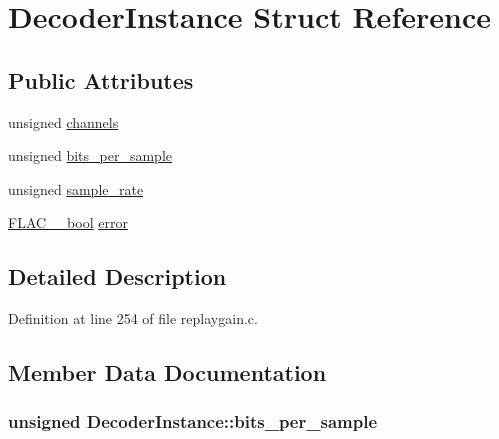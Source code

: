 \hypertarget{struct_decoder_instance}{}\section{Decoder\+Instance Struct Reference}
\label{struct_decoder_instance}
\subsection*{Public Attributes}
\begin{DoxyCompactItemize}
\item 
unsigned \hyperlink{struct_decoder_instance_aa4849aea2f110db8c663d7f38137dcc4}{channels}
\item 
unsigned \hyperlink{struct_decoder_instance_abe69d281cd5beeb287a80feea9067642}{bits\+\_\+per\+\_\+sample}
\item 
unsigned \hyperlink{struct_decoder_instance_a3cc8c086234e3e851cee49a767f82054}{sample\+\_\+rate}
\item 
\hyperlink{ordinals_8h_a95103469f1cbd78b8cf250194985b34e}{F\+L\+A\+C\+\_\+\+\_\+bool} \hyperlink{struct_decoder_instance_a6c9aa0b901f26c34c8971560d3a6a04b}{error}
\end{DoxyCompactItemize}


\subsection{Detailed Description}


Definition at line 254 of file replaygain.\+c.



\subsection{Member Data Documentation}
\subsubsection[{\texorpdfstring{bits\+\_\+per\+\_\+sample}{bits_per_sample}}]{\setlength{\rightskip}{0pt plus 5cm}unsigned Decoder\+Instance\+::bits\+\_\+per\+\_\+sample}\hypertarget{struct_decoder_instance_abe69d281cd5beeb287a80feea9067642}{}\label{struct_decoder_instance_abe69d281cd5beeb287a80feea9067642}


